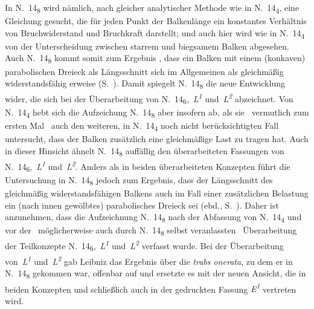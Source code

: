 In N.~14\textsubscript{8} wird nämlich, nach gleicher analytischer Methode wie in N.~14\textsubscript{4}, eine Gleichung gesucht, die für jeden Punkt der Balkenlänge ein konstantes Verhältnis von Bruchwiderstand und Bruchkraft darstellt; und auch hier wird wie in N.~14\textsubscript{4} von der Unterscheidung zwischen starrem und biegsamem Balken abgesehen.
Auch N.~14\textsubscript{8} kommt somit zum Ergebnis%
, dass ein Balken mit einem (konkaven) parabolischen Dreieck als Längsschnitt sich im Allgemeinen als gleichmäßig widerstandsfähig erweise (S.~).
Damit spiegelt N.~14\textsubscript{8} die neue Entwicklung wider, die sich bei der Überarbeitung von N.~14\textsubscript{6},~\textit{L\textsuperscript{1}} und~\textit{L\textsuperscript{2}} abzeichnet.
Von N.~14\textsubscript{4} hebt sich die Aufzeichung N.~14\textsubscript{8} %
aber insofern ab, als sie \textendash\ vermutlich zum ersten Mal \textendash\ auch den weiteren, in N.~14\textsubscript{4} noch nicht berücksichtigten Fall untersucht, dass der Balken zusätzlich eine gleichmäßige Last zu tragen hat.
Auch in dieser Hinsicht ähnelt N.~14\textsubscript{8} auffällig den überarbeiteten Fassungen von N.~14\textsubscript{6},~\textit{L\textsuperscript{1}} und~\textit{L\textsuperscript{2}}.
Anders als in beiden überarbeiteten Konzepten führt die Untersuchung in N.~14\textsubscript{8} jedoch zum Ergebnis, dass der Längsschnitt des gleichmäßig widerstandsfähigen Balkens auch im Fall einer zusätzlichen Belastung ein (nach innen gewölbtes) parabolisches Dreieck sei (ebd., S.~).
Daher ist anzunehmen, dass die Aufzeichnung N.~14\textsubscript{8} nach der Abfassung von N.~14\textsubscript{4} und vor der \textendash\ möglicherweise auch durch N.~14\textsubscript{8} selbst veranlassten \textendash\ Überarbeitung der Teilkonzepte N.~14\textsubscript{6},~\textit{L\textsuperscript{1}} und~\textit{L\textsuperscript{2}} verfasst wurde.
Bei der Überarbeitung von~\textit{L\textsuperscript{1}} und~\textit{L\textsuperscript{2}} gab Leibniz das Ergebnis über die \textit{trabs onerata}, zu dem er in N.~14\textsubscript{8} gekommen war, offenbar auf und ersetzte es mit der neuen Ansicht, die in beiden Konzepten und schließlich auch in der gedruckten Fassung \textit{E\textsuperscript{1}} vertreten wird.
